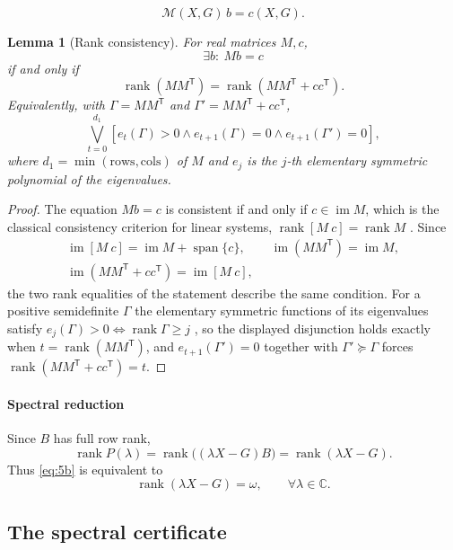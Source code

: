 \documentclass[journal]{IEEEtran}
\theoremstyle{plainn}
\newtheorem{lem}[thm]{Lemma}
\theoremstyle{remark}
\begin{document}
\begin{equation*}
\mathcal M(X,G)\,b=c(X,G).
\end{equation*}

\begin{lem}[Rank consistency]\label{lem:rankcons}
	For real matrices $M,c$,
	\[
	\exists b:\ Mb=c
	\]
	if and only if
	\[
	\operatorname{rank}(MM^{\mathsf T})
	=\operatorname{rank}(MM^{\mathsf T}+cc^{\mathsf T}).
	\]
	Equivalently, with $\Gamma=MM^{\mathsf T}$ and
	$\Gamma'=MM^{\mathsf T}+cc^{\mathsf T}$,
	\[
	\bigvee_{t=0}^{d_1}
	\left[e_t(\Gamma)>0\wedge e_{t+1}(\Gamma)=0\wedge e_{t+1}(\Gamma')=0\right],
	\]
	where $d_1=\min(\text{rows},\text{cols})$ of $M$ and $e_j$ is the
	$j$-th elementary symmetric polynomial of the eigenvalues.
\end{lem}

\begin{proof}
The equation $Mb=c$ is consistent if and only if $c\in\operatorname{im}M$, which is the classical
consistency criterion for linear systems, $\operatorname{rank}[M\ c]=\operatorname{rank}M$
\cite[Ch.~0]{hj13}. Since
\[
\begin{gathered}
\operatorname{im}[M\ c]=\operatorname{im}M+\operatorname{span}\{c\},\qquad
\operatorname{im}(MM^{\mathsf T})=\operatorname{im}M,\\
\operatorname{im}(MM^{\mathsf T}+cc^{\mathsf T})=\operatorname{im}[M\ c],
\end{gathered}
\]
the two rank equalities of the statement describe the same condition. For a positive semidefinite
$\Gamma$ the elementary symmetric functions of its eigenvalues satisfy
$e_j(\Gamma)>0\iff\operatorname{rank}\Gamma\ge j$ \cite[Ch.~4]{hj13}, so the displayed disjunction
holds exactly when $t=\operatorname{rank}(MM^{\mathsf T})$, and
$e_{t+1}(\Gamma')=0$ together with $\Gamma'\succeq\Gamma$ forces
$\operatorname{rank}(MM^{\mathsf T}+cc^{\mathsf T})=t$.
\end{proof}

\paragraph*{Spectral reduction}\label{sec:spectral}
Since $B$ has full row rank,
\[
\operatorname{rank}P(\lambda)
=\operatorname{rank}\bigl((\lambda X-G)B\bigr)
=\operatorname{rank}(\lambda X-G).
\]
Thus \eqref{eq:5b} is equivalent to
\[
\operatorname{rank}(\lambda X-G)=\omega,\qquad\forall\lambda\in\mathbb C .
\]

\subsection{The spectral certificate}\label{sec:spectrum}
\end{document}
